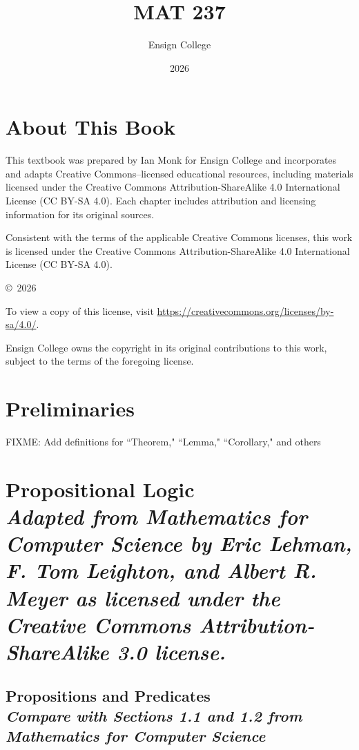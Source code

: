 \documentclass[11pt,oneside]{book}
\theoremstyle{definition}
\begin{document}
%
%
\frontmatter

\title{MAT 237}
\author{Ensign College}
\date{2026}
\maketitle

\chapter*{About This Book}
This textbook was prepared by Ian Monk for Ensign College and incorporates and adapts Creative Commons–licensed educational resources, including materials licensed under the Creative Commons Attribution-ShareAlike 4.0 International License (CC BY-SA 4.0). Each chapter includes attribution and licensing information for its original sources.

Consistent with the terms of the applicable Creative Commons licenses, this work is licensed under the Creative Commons Attribution-ShareAlike 4.0 International License (CC BY-SA 4.0).

\vfill
\noindent \copyright\ 2026 \theauthor \newline

\noindent To view a copy of this license, visit \url{https://creativecommons.org/licenses/by-sa/4.0/}. \newline

\noindent Ensign College owns the copyright in its original contributions to this work, subject to the terms of the foregoing license.


\tableofcontents

\chapter{Preliminaries}
FIXME: Add definitions for ``Theorem," ``Lemma," ``Corollary," and others


%
%
\mainmatter
\chapter[Propositional Logic]{Propositional Logic\\[0.5ex]
\normalsize\normalfont\textit{
    Adapted from \emph{Mathematics for Computer Science} by Eric Lehman, F. Tom Leighton, and Albert R. Meyer as licensed under the Creative Commons Attribution-ShareAlike 3.0 license.
}}

\section[Propositions and Predicates]{Propositions and Predicates\\[0.5ex]
\normalsize\normalfont\textit{
    Compare with Sections 1.1 and 1.2 from \emph{Mathematics for Computer Science}
}}
\end{document}

